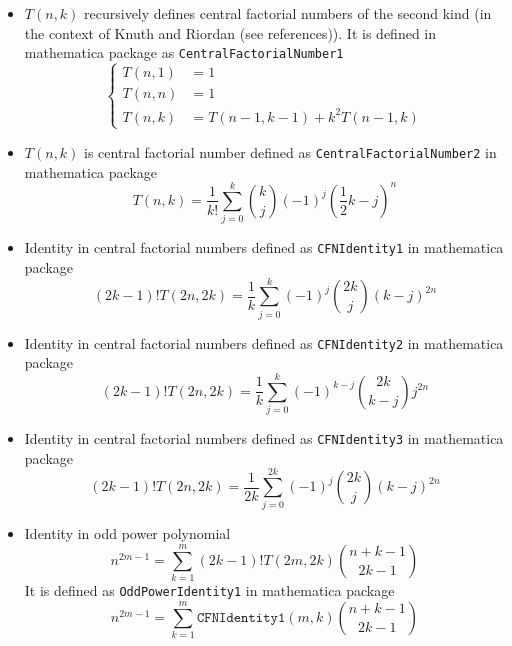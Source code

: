 \begin{itemize}
    \item $T(n,k)$ recursively defines central factorial numbers of the second kind
    (in the context of Knuth and Riordan (see references)).
    It is defined in mathematica package as \texttt{CentralFactorialNumber1}
    \begin{equation*}
        \begin{cases}
            T(n,1) &=1 \\
            T(n,n) &=1 \\
            T(n,k) &=T(n-1, k-1) + k^2 T(n-1, k)
        \end{cases}
    \end{equation*}
    \item $T(n,k)$ is central factorial number defined as \texttt{CentralFactorialNumber2} in mathematica package
    \begin{equation*}
        T(n,k) = \frac{1}{k!} \sum_{j=0}^{k} \binom{k}{j} (-1)^{j} \left( \frac{1}{2}k - j \right)^{n}
    \end{equation*}
    \item Identity in central factorial numbers defined as \texttt{CFNIdentity1} in mathematica package
    \begin{equation*}
    (2k-1)! T(2n,2k) = \frac{1}{k} \sum_{j=0}^{k} (-1)^j \binom{2k}{j} (k-j)^{2n}
    \end{equation*}
    \item Identity in central factorial numbers defined as \texttt{CFNIdentity2} in mathematica package
    \begin{equation*}
    (2k-1)! T(2n,2k) = \frac{1}{k} \sum_{j=0}^{k} (-1)^{k-j} \binom{2k}{k-j} j^{2n}
    \end{equation*}
    \item Identity in central factorial numbers defined as \texttt{CFNIdentity3} in mathematica package
    \begin{equation*}
    (2k-1)! T(2n, 2k) = \frac{1}{2k} \sum_{j=0}^{2k} (-1)^{j} \binom{2k}{j} (k-j)^{2n}
    \end{equation*}
    \item Identity in odd power polynomial
    \begin{equation*}
        n^{2m-1} = \sum_{k=1}^{m} (2k-1)! T(2m,2k) \binom{n+k-1}{2k-1}
    \end{equation*}
    It is defined as \texttt{OddPowerIdentity1} in mathematica package
    \begin{equation*}
        n^{2m-1} = \sum_{k=1}^{m} \mathtt{CFNIdentity1} (m,k) \binom{n+k-1}{2k-1}

\end{equation*}
\end{itemize}
